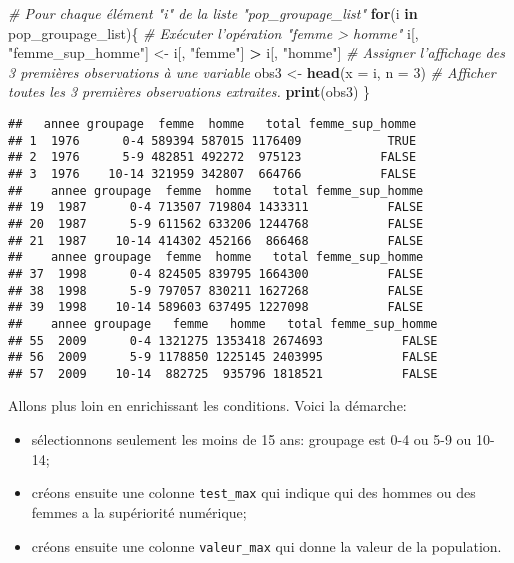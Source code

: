 \documentclass[]{book}
\newenvironment{Shaded}{\begin{snugshade}}{\end{snugshade}}
\newcommand{\KeywordTok}[1]{\textcolor[rgb]{0.13,0.29,0.53}{\textbf{#1}}}
\newcommand{\DataTypeTok}[1]{\textcolor[rgb]{0.13,0.29,0.53}{#1}}
\newcommand{\DecValTok}[1]{\textcolor[rgb]{0.00,0.00,0.81}{#1}}
\newcommand{\StringTok}[1]{\textcolor[rgb]{0.31,0.60,0.02}{#1}}
\newcommand{\CommentTok}[1]{\textcolor[rgb]{0.56,0.35,0.01}{\textit{#1}}}
\newcommand{\ControlFlowTok}[1]{\textcolor[rgb]{0.13,0.29,0.53}{\textbf{#1}}}
\newcommand{\OperatorTok}[1]{\textcolor[rgb]{0.81,0.36,0.00}{\textbf{#1}}}
\newcommand{\NormalTok}[1]{#1}
\begin{document}
\begin{Shaded}
\begin{Highlighting}[]
  \CommentTok{# Pour chaque élément "i" de la liste "pop_groupage_list"}
\ControlFlowTok{for}\NormalTok{(i }\ControlFlowTok{in}\NormalTok{ pop_groupage_list)\{}
  \CommentTok{# Exécuter l'opération "femme > homme"}
\NormalTok{  i[, }\StringTok{"femme_sup_homme"}\NormalTok{] <-}\StringTok{ }\NormalTok{i[, }\StringTok{"femme"}\NormalTok{] }\OperatorTok{>}\StringTok{ }\NormalTok{i[, }\StringTok{"homme"}\NormalTok{] }
  \CommentTok{# Assigner l'affichage des 3 premières observations à une variable}
\NormalTok{  obs3 <-}\StringTok{ }\KeywordTok{head}\NormalTok{(}\DataTypeTok{x =}\NormalTok{ i, }\DataTypeTok{n =} \DecValTok{3}\NormalTok{) }
  \CommentTok{# Afficher toutes les 3 premières observations extraites.}
  \KeywordTok{print}\NormalTok{(obs3) }
\NormalTok{\}}
\end{Highlighting}
\end{Shaded}

\begin{verbatim}
##   annee groupage  femme  homme   total femme_sup_homme
## 1  1976      0-4 589394 587015 1176409            TRUE
## 2  1976      5-9 482851 492272  975123           FALSE
## 3  1976    10-14 321959 342807  664766           FALSE
##    annee groupage  femme  homme   total femme_sup_homme
## 19  1987      0-4 713507 719804 1433311           FALSE
## 20  1987      5-9 611562 633206 1244768           FALSE
## 21  1987    10-14 414302 452166  866468           FALSE
##    annee groupage  femme  homme   total femme_sup_homme
## 37  1998      0-4 824505 839795 1664300           FALSE
## 38  1998      5-9 797057 830211 1627268           FALSE
## 39  1998    10-14 589603 637495 1227098           FALSE
##    annee groupage   femme   homme   total femme_sup_homme
## 55  2009      0-4 1321275 1353418 2674693           FALSE
## 56  2009      5-9 1178850 1225145 2403995           FALSE
## 57  2009    10-14  882725  935796 1818521           FALSE
\end{verbatim}

Allons plus loin en enrichissant les conditions. Voici la démarche:

\begin{itemize}
\item
  sélectionnons seulement les moins de 15 ans: groupage est 0-4 ou 5-9
  ou 10-14;
\item
  créons ensuite une colonne \texttt{test\_max} qui indique qui des
  hommes ou des femmes a la supériorité numérique;
\item
  créons ensuite une colonne \texttt{valeur\_max} qui donne la valeur de
  la population.
\end{itemize}
\end{document}
